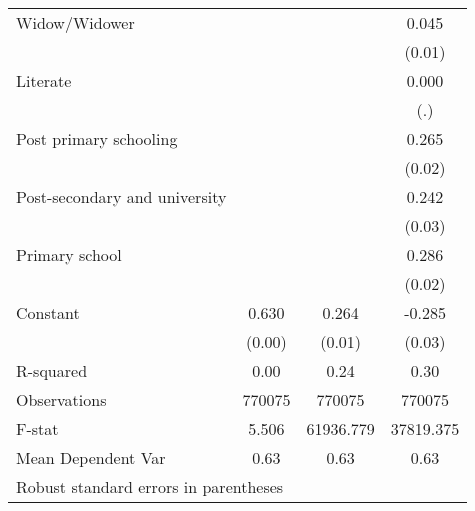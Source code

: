 {\begin{tabular}{l*{3}{c}}
Widow/Widower       &                     &                     &       0.045\sym{***}\\
                    &                     &                     &      (0.01)         \\
Literate            &                     &                     &       0.000         \\
                    &                     &                     &         (.)         \\
Post primary schooling&                     &                     &       0.265\sym{***}\\
                    &                     &                     &      (0.02)         \\
Post-secondary and university&                     &                     &       0.242\sym{***}\\
                    &                     &                     &      (0.03)         \\
Primary school      &                     &                     &       0.286\sym{***}\\
                    &                     &                     &      (0.02)         \\
Constant            &       0.630\sym{***}&       0.264\sym{***}&      -0.285\sym{***}\\
                    &      (0.00)         &      (0.01)         &      (0.03)         \\
\hline
R-squared           &        0.00         &        0.24         &        0.30         \\
Observations        &      770075         &      770075         &      770075         \\
F-stat              &       5.506         &   61936.779         &   37819.375         \\
Mean Dependent Var  &        0.63         &        0.63         &        0.63         \\
\hline\hline
\multicolumn{4}{l}{\footnotesize Robust standard errors in parentheses}\\
\end{tabular}
}
